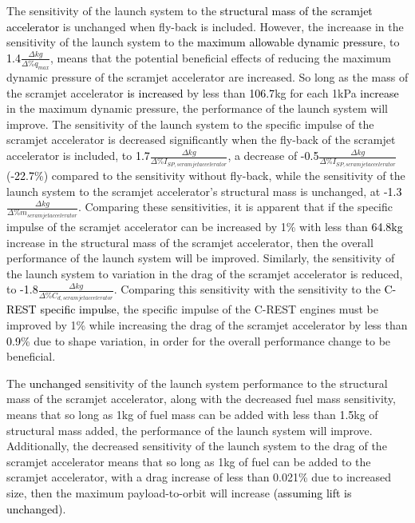 The sensitivity of the launch system to the \textcolor{black}{structural mass of the scramjet accelerator} is unchanged when fly-back is included. However, the increaase in the sensitivity of the launch system to the \textcolor{black}{maximum allowable dynamic pressure}, to \textcolor{black}{1.4}$\frac{\Delta kg}{\Delta\%q_{max}}$, means that the potential beneficial effects of reducing the maximum dynamic pressure of the scramjet accelerator are increased. So long as the mass of the scramjet accelerator \textcolor{black}{is increased} by less than \textcolor{black}{106.7}kg for each 1kPa \textcolor{black}{increase} in the maximum dynamic pressure, the performance of the launch system will improve.
 The sensitivity of the launch system to the specific impulse of the scramjet accelerator is decreased significantly when the fly-back of the scramjet accelerator is included, to \textcolor{black}{1.7}$\frac{\Delta kg}{\Delta\%I_{SP,scramjet accelerator}}$, a decrease of \textcolor{black}{-0.5}$\frac{\Delta kg}{\Delta\%I_{SP,scramjet accelerator}}$ (\textcolor{black}{-22.7}\%) compared to the sensitivity without fly-back, while the sensitivity of the launch system to the scramjet accelerator's structural mass is unchanged, at \textcolor{black}{-1.3}$\frac{\Delta kg}{\Delta\%m_{scramjet accelerator}}$. Comparing these sensitivities, it is apparent that if the specific impulse of the scramjet accelerator can be increased by 1\% with less than \textcolor{black}{64.8kg} increase in the structural mass of the scramjet accelerator, then the overall performance of the launch system will be improved.  
Similarly, the sensitivity of the launch system to variation in the drag of the scramjet accelerator is reduced, to \textcolor{black}{-1.8}$\frac{\Delta kg}{\Delta\%C_{d,scramjet accelerator}}$. Comparing this sensitivity with the sensitivity to the \textcolor{black}{C-REST specific impulse}, the specific impulse of the C-REST engines must be improved by 1\% while increasing the drag of the scramjet accelerator by less than \textcolor{black}{0.9}\% due to shape variation, in order for the overall performance change to be beneficial. 

The \textcolor{black}{unchanged} sensitivity of the launch system performance to the structural mass of the scramjet accelerator, along with the decreased fuel mass sensitivity, means that so long as 1kg of fuel mass can be added with less than \textcolor{black}{1.5}kg of structural mass added, the performance of the launch system will improve. Additionally, the decreased sensitivity of the launch system to the drag of the scramjet accelerator means that so long as 1kg of fuel can be added to the scramjet accelerator, with a drag increase of less than 0.021\% due to increased size, then the maximum payload-to-orbit will increase \textcolor{black}{(assuming lift is unchanged)}. 

